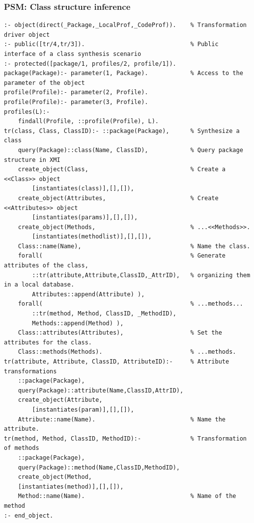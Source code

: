 \documentclass[10pt]{beamer}
\begin{document}
\begin{frame}[fragile]
  \frametitle{PSM: Class structure inference}

\begin{verbatim}
:- object(direct(_Package,_LocalProf,_CodeProf)).    % Transformation driver object
:- public([tr/4,tr/3]).                              % Public interface of a class synthesis scenario
:- protected([package/1, profiles/2, profile/1]).
package(Package):- parameter(1, Package).            % Access to the parameter of the object
profile(Profile):- parameter(2, Profile).
profile(Profile):- parameter(3, Profile).
profiles(L):-
    findall(Profile, ::profile(Profile), L).
tr(class, Class, ClassID):- ::package(Package),      % Synthesize a class
    query(Package)::class(Name, ClassID),            % Query package structure in XMI
    create_object(Class,                             % Create a <<Class>> object
        [instantiates(class)],[],[]),
    create_object(Attributes,                        % Create <<Attributes>> object
        [instantiates(params)],[],[]),
    create_object(Methods,                           % ...<<Methods>>.
        [instantiates(methodlist)],[],[]),
    Class::name(Name),                               % Name the class.
    forall(                                          % Generate attributes of the class,
        ::tr(attribute,Attribute,ClassID,_AttrID),   % organizing them in a local database.
        Attributes::append(Attribute) ),
    forall(                                          % ...methods...
        ::tr(method, Method, ClassID, _MethodID),
        Methods::append(Method) ),
    Class::attributes(Attributes),                   % Set the attributes for the class.
    Class::methods(Methods).                         % ...methods.
tr(attribute, Attribute, ClassID, AttributeID):-     % Attribute transformations
    ::package(Package),
    query(Package)::attribute(Name,ClassID,AttrID),
    create_object(Attribute,
        [instantiates(param)],[],[]),
    Attribute::name(Name).                           % Name the attribute.
tr(method, Method, ClassID, MethodID):-              % Transformation of methods
    ::package(Package),
    query(Package)::method(Name,ClassID,MethodID),
    create_object(Method,
    [instantiates(method)],[],[]),
    Method::name(Name).                              % Name of the method
:- end_object.
\end{verbatim}
\end{frame}
\end{document}
